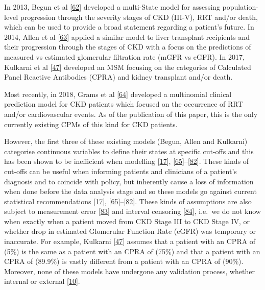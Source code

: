 \documentclass[12pt,PhD,twoside,openright]{muthesis}
\begin{document}
In 2013, Begun et al {[}\protect\hyperlink{ref-begun_identification_2013}{62}{]} developed a multi-State model for assessing population-level progression through the severity stages of CKD (III-V), RRT and/or death, which can be used to provide a broad statement regarding a patient's future. In 2014, Allen et al {[}\protect\hyperlink{ref-allen_chronic_2014}{63}{]} applied a similar model to liver transplant recipients and their progression through the stages of CKD with a focus on the predictions of measured vs estimated glomerular filtration rate (mGFR vs eGFR). In 2017, Kulkarni et al {[}\protect\hyperlink{ref-kulkarni_transition_2017}{47}{]} developed an MSM focusing on the categories of Calculated Panel Reactive Antibodies (CPRA) and kidney transplant and/or death.

Most recently, in 2018, Grams et al {[}\protect\hyperlink{ref-grams_predicting_2018}{64}{]} developed a multinomial clinical prediction model for CKD patients which focused on the occurrence of RRT and/or cardiovascular events. As of the publication of this paper, this is the only currently existing CPMs of this kind for CKD patients.

However, the first three of these existing models (Begun, Allen and Kulkarni) categorise continuous variables to define their states at specific cut-offs and this has been shown to be inefficient when modelling {[}\protect\hyperlink{ref-royston_dichotomizing_2006}{17}{]}, {[}\protect\hyperlink{ref-altman_problems_1994-1}{65}{]}--{[}\protect\hyperlink{ref-weinberg_how_1995}{82}{]}. These kinds of cut-offs can be useful when informing patients and clinicians of a patient's diagnosis and to coincide with policy, but inherently cause a loss of information when done before the data analysis stage and so these models go against current statistical recommendations {[}\protect\hyperlink{ref-royston_dichotomizing_2006}{17}{]}, {[}\protect\hyperlink{ref-altman_problems_1994-1}{65}{]}--{[}\protect\hyperlink{ref-weinberg_how_1995}{82}{]}. These kinds of assumptions are also subject to measurement error {[}\protect\hyperlink{ref-van_smeden_reflection_2019}{83}{]} and interval censoring {[}\protect\hyperlink{ref-sun_interval_2005}{84}{]}, i.e.~we do not know when exactly when a patient moved from CKD Stage III to CKD Stage IV, or whether drop in estimated Glomerular Function Rate (eGFR) was temporary or inaccurate. For example, Kulkarni {[}\protect\hyperlink{ref-kulkarni_transition_2017}{47}{]} assumes that a patient with an CPRA of (5\%) is the same as a patient with an CPRA of (75\%) and that a patient with an CPRA of (89.9\%) is vastly different from a patient with an CPRA of (90\%). Moreover, none of these models have undergone any validation process, whether internal or external {[}\protect\hyperlink{ref-altman_prognosis_2009}{10}{]}.
\end{document}
